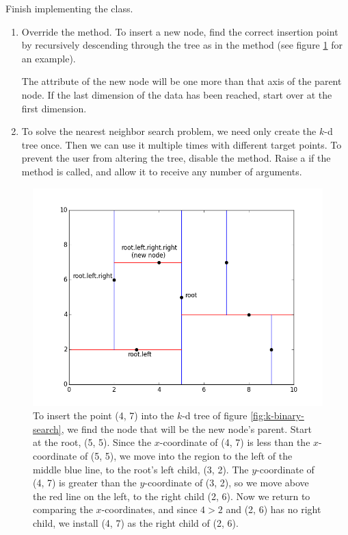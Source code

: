 \begin{problem}
Finish implementing the  class.
\begin{enumerate}
\item Override the  method.
To insert a new node, find the correct insertion point by recursively descending through the tree as in the  method (see figure \ref{fig:k-insert} for an example).

The  attribute of the new node will be one more than that axis of the parent node.
If the last dimension of the data has been reached, start over at the first dimension.

\item To solve the nearest neighbor search problem, we need only create the $k$-d tree once.
Then we can use it multiple times with different target points.
To prevent the user from altering the tree, disable the  method.
Raise a  if the method is called, and allow it to receive any number of arguments.
\end{enumerate}
\end{problem}

\begin{figure}[H]
\includegraphics[width=\textwidth]{kdpic2.png}
\caption{To insert the point (4, 7) into the $k$-d tree of figure \ref{fig:k-binary-search}, we find the node that will be the new node's parent. Start at the root, (5, 5). Since the $x$-coordinate of (4, 7) is less than the $x$-coordinate of (5, 5), we move into the region to the left of the middle blue line, to the root's left child, (3, 2). The $y$-coordinate of (4, 7) is greater than the $y$-coordinate of (3, 2), so we move above the red line on the left, to the right child (2, 6). Now we return to comparing the $x$-coordinates, and since $4 > 2$ and (2, 6) has no right child, we install (4, 7) as the right child of (2, 6).}
\label{fig:k-insert}
\end{figure}

